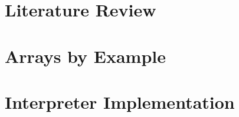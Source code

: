\documentclass[12pt]{article}
\begin{document}

\clearpage

\tableofcontents
\clearpage


\clearpage

\section{Literature Review}
\clearpage

\section{Arrays by Example}
\clearpage


\clearpage


\clearpage

\section{Interpreter Implementation}
\clearpage

\printbibliography
\clearpage

\appendix

\clearpage


\end{document}
